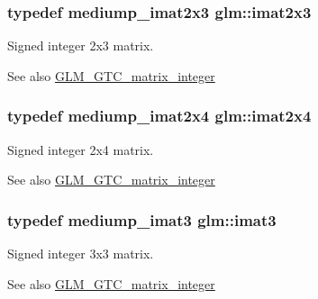 \subsubsection[{imat2x3}]{\setlength{\rightskip}{0pt plus 5cm}typedef mediump\+\_\+imat2x3 {\bf glm\+::imat2x3}}\label{group__gtc__matrix__integer_ga143bc5177bac9991d84b70da03952516}
Signed integer 2x3 matrix. \begin{DoxySeeAlso}{See also}
\hyperlink{group__gtc__matrix__integer}{G\+L\+M\+\_\+\+G\+T\+C\+\_\+matrix\+\_\+integer} 
\end{DoxySeeAlso}
\hypertarget{group__gtc__matrix__integer_gafe2d058e164fd1badace451ffcf4ae46}{}
\subsubsection[{imat2x4}]{\setlength{\rightskip}{0pt plus 5cm}typedef mediump\+\_\+imat2x4 {\bf glm\+::imat2x4}}\label{group__gtc__matrix__integer_gafe2d058e164fd1badace451ffcf4ae46}
Signed integer 2x4 matrix. \begin{DoxySeeAlso}{See also}
\hyperlink{group__gtc__matrix__integer}{G\+L\+M\+\_\+\+G\+T\+C\+\_\+matrix\+\_\+integer} 
\end{DoxySeeAlso}
\hypertarget{group__gtc__matrix__integer_ga45481922dd07a3a8e23758286311ee97}{}
\subsubsection[{imat3}]{\setlength{\rightskip}{0pt plus 5cm}typedef mediump\+\_\+imat3 {\bf glm\+::imat3}}\label{group__gtc__matrix__integer_ga45481922dd07a3a8e23758286311ee97}
Signed integer 3x3 matrix. \begin{DoxySeeAlso}{See also}
\hyperlink{group__gtc__matrix__integer}{G\+L\+M\+\_\+\+G\+T\+C\+\_\+matrix\+\_\+integer} 
\end{DoxySeeAlso}
\hypertarget{group__gtc__matrix__integer_ga04deef94cdfdd3b3b2706e10a32ef7f3}{}
